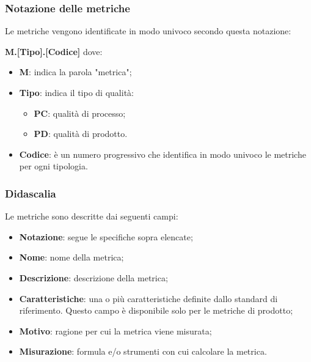 \subsubsection{Notazione delle metriche}
\par Le metriche vengono identificate in modo univoco secondo questa notazione: 
\par \textbf{M.[Tipo].[Codice]}
dove: 
\begin{itemize}
    \item \textbf{M}: indica la parola "metrica";
    \item \textbf{Tipo}: indica il tipo di qualità: 
        \begin{itemize}
            \item \textbf{PC}: qualità di processo; 
            \item \textbf{PD}: qualità di prodotto.
        \end{itemize}
    \item \textbf{Codice}: è un numero progressivo che identifica in modo univoco le metriche per ogni tipologia.
\end{itemize}

\subsubsection{Didascalia}
Le metriche sono descritte dai seguenti campi:
\begin{itemize}
    \item \textbf{Notazione}: segue le specifiche sopra elencate;
    \item \textbf{Nome}: nome della metrica;
    \item \textbf{Descrizione}: descrizione della metrica;
    \item \textbf{Caratteristiche}: una o più caratteristiche definite dallo standard di riferimento. Questo campo è disponibile solo per le metriche di prodotto;
    \item \textbf{Motivo}: ragione per cui la metrica viene misurata;
    \item \textbf{Misurazione}: formula e/o strumenti con cui calcolare la metrica.
\end{itemize}

